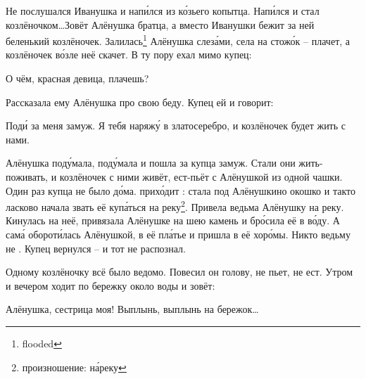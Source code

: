 %
Не послушался Иванушка и нап\'{и}лся из к\'{о}зьего копытца. Нап\'{и}лся и стал козлёночком\dots Зовёт Алёнушка братца, а вместо Иванушки бежит за ней беленький козлёночек. Залилась\footnote{flooded} Алёнушка слез\'{а}ми, села на стож\'{о}к -- плачет, а козлёночек в\'{о}зле неё скачет. В ту пору ехал мимо купец:
%
\begin{dialogue}
    \item О чём, красная девица, плачешь?
\end{dialogue}
Рассказала ему Алёнушка про свою беду. Купец ей и говорит:
\begin{dialogue}
    \item Под\'{и} за меня замуж. Я тебя наряж\'{у} в златосеребро, и козлёночек будет жить с нами.
\end{dialogue}
Алёнушка под\'{у}мала, под\'{у}мала и пошла за купца замуж. Стали они жить-поживать, и козлёночек с ними живёт, ест-пьёт с Алёнушкой из одной чашки. Один раз купца не было д\'{о}ма.  прих\'{о}дит : стала под Алёнушкино окошко и такто ласково начала звать её куп\'{а}ться на реку\footnote{произношение: н\'{а}реку}. Привела ведьма Алёнушку на реку. Кинулась на неё, привязала Алёнушке на шею камень и бр\'{о}сила её в в\'{о}ду. А сам\'{а} оборот\'{и}лась Алёнушкой,  в её пл\'{а}тье и пришла в её хор\'{о}мы. Никто ведьму не . Купец вернулся -- и тот не распознал.

Одному козлёночку всё было ведомо. Повесил он голову, не пьет, не ест. Утром и вечером ходит по бережку около воды и зовёт:
\begin{dialogue}
    \item Алёнушка, сестрица моя! Выплынь, выплынь на бережок\dots
\end{dialogue}

